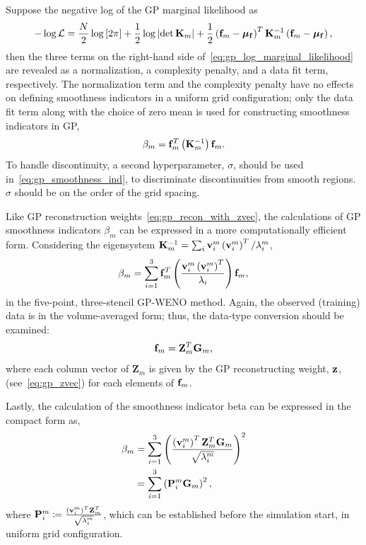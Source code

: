 Suppose the negative log of the GP marginal likelihood as
\begin{equation}\label{eq:gp_log_marginal_likelihood}
    -\log \mathcal{L} = \frac{N}{2} \log \left[ 2 \pi \right] + \frac{1}{2} \log \left| \det \mathbf{K}_{m} \right|
        + \frac{1}{2} \left( \mathbf{f}_{m} - \bm{\mu}_{\mathbf{f}} \right)^{T} \mathbf{K}_{m}^{-1} \left( \mathbf{f}_{m} - \bm{\mu}_{\mathbf{f}} \right),
\end{equation}
then the three terms on the right-hand side of~\cref{eq:gp_log_marginal_likelihood} are revealed as
a normalization, a complexity penalty, and a data fit term, respectively.
The normalization term and the complexity penalty have no effects on defining smoothness indicators
in a uniform grid configuration; only the data fit term along with the choice of zero mean is used
for constructing smoothness indicators in GP,
\begin{equation}\label{eq:gp_smoothness_ind}
    \beta_{m} = \mathbf{f}_{m}^{T} \left( \mathbf{K}^{-1}_{m} \right) \mathbf{f}_{m}.
\end{equation}
To handle discontinuity, a second hyperparameter, \( \sigma \), should be used in~\cref{eq:gp_smoothness_ind},
to discriminate discontinuities from smooth regions. \( \sigma \) should be on the order of the grid spacing.

Like GP reconstruction weights~\cref{eq:gp_recon_with_zvec}, the calculations of
GP smoothness indicators \( \beta_{m} \) can be expressed in a more computationally efficient form.
Considering the eigensystem \( \mathbf{K}_{m}^{-1} = \sum_{i} \mathbf{v}_{i}^{m} \left( \mathbf{v}_{i}^{m} \right)^{T}/\lambda_{i}^{m} \),
\begin{equation}\label{eq:gp_smoothness_ind_with_eig}
    \beta_{m} = \sum_{i=1}^{3} \mathbf{f}_{m}^{T} \left( \frac{\mathbf{v}_{i}^{m} \left( \mathbf{v}_{i}^{m} \right)^{T}}{\lambda_{i}} \right) \mathbf{f}_{m},
\end{equation}
in the five-point, three-stencil GP-WENO method\@.
Again, the observed (training) data is in the volume-averaged form;
thus, the data-type conversion should be examined:
\begin{equation}\label{}
    \mathbf{f}_{m} = \mathbf{Z}_{m}^{T} \mathbf{G}_{m},
\end{equation}
where each column vector of \( \mathbf{Z}_{m} \) is given by the GP reconstructing weight, \( \mathbf{z} \), (see~\cref{eq:gp_zvec})
for each elements of \( \mathbf{f}_{m} \).

Lastly, the calculation of the smoothness indicator beta can be expressed in the compact form as,
\begin{equation}\label{eq:gp_weno_smooth_ind}
    \begin{split}
        \beta_{m} &= \sum_{i=1}^{3} \left( \frac{ \left( \mathbf{v}_{i}^{m} \right)^{T} \mathbf{Z}_{m}^{T} \mathbf{G}_{m} }{\sqrt{\lambda_{i}^{m}}} \right)^{2} \\
                  &= \sum_{i=1}^{3} \left( \mathbf{P}_{i}^{m} \mathbf{G}_{m} \right)^{2},
    \end{split}
\end{equation}
where \( \mathbf{P}_{i}^{m} \coloneqq \frac{ \left(\mathbf{v}_{i}^{m}\right)^{T} \mathbf{Z}_{m}^{T}}{\sqrt{\lambda_{i}^{m}}} \),
which can be established before the simulation start, in uniform grid configuration.

